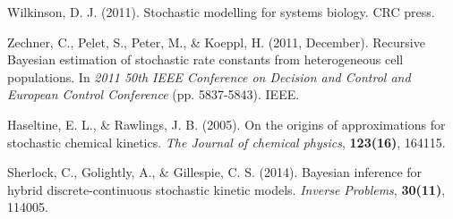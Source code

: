 \documentclass{bioinfo}
\begin{document}
\begin{thebibliography}{}
Wilkinson, D. J. (2011). Stochastic modelling for systems biology. CRC press.

Zechner, C., Pelet, S., Peter, M., \& Koeppl, H. (2011, December). Recursive Bayesian estimation of stochastic rate constants from heterogeneous cell populations. In \textit{2011 50th IEEE Conference on Decision and Control and European Control Conference} (pp. 5837-5843). IEEE.

Haseltine, E. L., \& Rawlings, J. B. (2005). On the origins of approximations for stochastic chemical kinetics. \textit{The Journal of chemical physics}, \textbf{123(16)}, 164115.

Sherlock, C., Golightly, A., \& Gillespie, C. S. (2014). Bayesian inference for hybrid discrete-continuous stochastic kinetic models. \textit{Inverse Problems}, \textbf{30(11)}, 114005.


\end{thebibliography}
\end{document}
